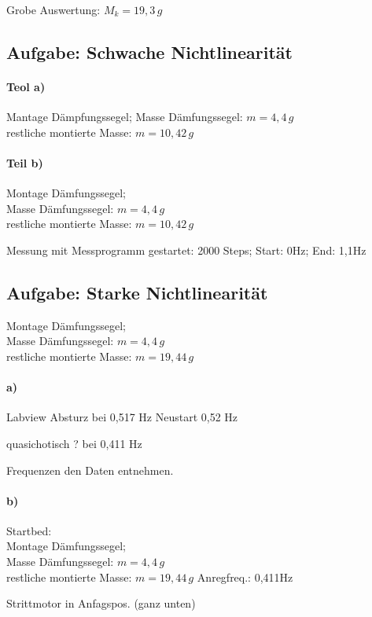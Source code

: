 Grobe Auswertung: \(M_k = 19,3 \, g\)

\subsection{Aufgabe: Schwache Nichtlinearität}
\paragraph{Teol a)}
Mantage Dämpfungssegel; Masse Dämfungssegel: \(m=4,4 \, g\)\\
restliche montierte Masse: \( m = 10,42 \,g \)


\paragraph{Teil b)}
Montage Dämfungssegel;\\
Masse Dämfungssegel: \(m=4,4 \, g\)\\
restliche montierte Masse: \( m = 10,42 \,g \)

Messung mit Messprogramm gestartet: 2000 Steps; Start: 0Hz; End: 1,1Hz


\subsection{Aufgabe: Starke Nichtlinearität}
Montage Dämfungssegel;\\
Masse Dämfungssegel: \(m=4,4 \, g\)\\
restliche montierte Masse: \( m = 19,44 \,g \)

\paragraph{a)}
Labview Absturz bei 0,517 Hz 
Neustart 0,52 Hz

quasichotisch ? bei 0,411 Hz

Frequenzen den Daten entnehmen.


\paragraph{b)}

Startbed: \\
Montage Dämfungssegel;\\
Masse Dämfungssegel: \(m=4,4 \, g\)\\
restliche montierte Masse: \( m = 19,44 \,g \)
Anregfreq.: 0,411Hz

Strittmotor in Anfagspos. (ganz unten)


